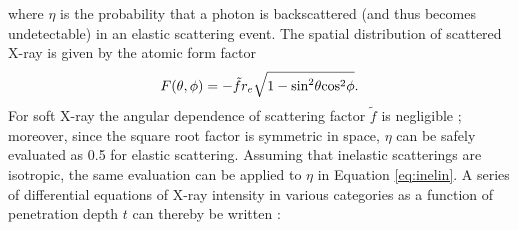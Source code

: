 \documentclass[]{article}
\begin{document}
where $\eta$ is the probability that a photon is backscattered (and thus becomes undetectable) in an elastic scattering event. The spatial distribution of scattered X-ray is given by the atomic form factor
\begin{equation}
F(\theta, \phi) = -\tilde{f}r_e\sqrt{1-\textup{sin}^2\theta \textup{cos}^2\phi}.
\end{equation}
For soft X-ray the angular dependence of scattering factor $\tilde{f}$ is negligible \cite{Lonsdale:1962gz}; moreover, since the square root factor is symmetric in space, $\eta$ can be safely evaluated as 0.5 for elastic scattering. Assuming that inelastic scatterings are isotropic, the same evaluation can be applied to $\eta$ in Equation \ref{eq:inelin}. A series of differential equations of X-ray intensity in various categories as a function of penetration depth $t$ can thereby be written \cite{Jacobsen:1998vj}:
\end{document}
